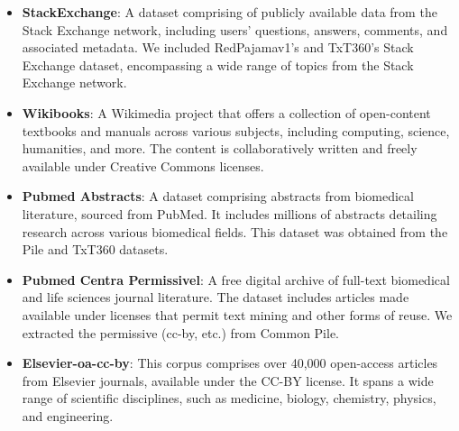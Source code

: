 \begin{itemize}
\item \textbf{StackExchange}: A dataset comprising of publicly available data from the Stack Exchange network, including users' questions, answers, comments, and associated metadata. We included RedPajamav1's and TxT360's Stack Exchange dataset, encompassing a wide range of topics from the Stack Exchange network.


\item \textbf{Wikibooks}: A Wikimedia project that offers a collection of open-content textbooks and manuals across various subjects, including computing, science, humanities, and more. The content is collaboratively written and freely available under Creative Commons licenses.

\item \textbf{Pubmed Abstracts}: A dataset comprising abstracts from biomedical literature, sourced from PubMed. It includes millions of abstracts detailing research across various biomedical fields. This dataset was obtained from the Pile and TxT360 datasets.

\item \textbf{Pubmed Centra Permissivel}: A free digital archive of full-text biomedical and life sciences journal literature. The dataset includes articles made available under licenses that permit text mining and other forms of reuse. We extracted the permissive (cc-by, etc.) from Common Pile.


\item \textbf{Elsevier-oa-cc-by}: This corpus comprises over 40,000 open-access articles from Elsevier journals, available under the CC-BY license. It spans a wide range of scientific disciplines, such as medicine, biology, chemistry, physics, and engineering.


\end{itemize}
